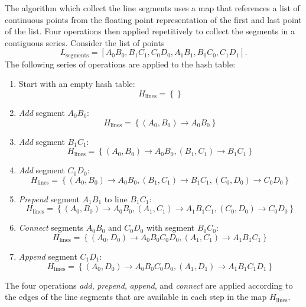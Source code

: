 \documentclass[english, a4paper]{article}
\begin{document}
The algorithm which collect the line segments uses a map that references a list of continuous points from the floating point representation of the first and last point of the list. Four operations then applied repetitively to collect the segments in a contiguous series. Consider the list of points
\begin{equation}
	L_{\mathrm{segments}} = \left[ A_{0}B_{0}, B_{1} C_{1}, C_{0}D_{0}, A_{1}B_{1}, B_{0}C_{0}, C_{1} D_{1} \right].
\end{equation}
The following series of operations are applied to the hash table:
\begin{enumerate}
\item Start with an empty hash table:
	\begin{equation}
		H_{\mathrm{lines}} = \left\{ \right\}
	\end{equation}
\item \emph{Add} segment $A_{0} B_{0}$:
	\begin{equation}
		H_{\mathrm{lines}} = \left\{ (A_{0}, B_{0}) \to A_{0} B_{0} \right\}
	\end{equation}
\item \emph{Add} segment $B_{1} C_{1}$:
	\begin{equation}
		H_{\mathrm{lines}} = \left\{ (A_{0}, B_{0}) \to A_{0} B_{0}, (B_{1}, C_{1}) \to B_{1} C_{1} \right\}
	\end{equation}
\item \emph{Add} segment $C_{0} D_{0}$:
	\begin{equation}
		H_{\mathrm{lines}} = \left\{ (A_{0}, B_{0}) \to A_{0} B_{0}, (B_{1}, C_{1}) \to B_{1} C_{1}, (C_{0}, D_{0}) \to C_{0} D_{0} \right\}
	\end{equation}
\item \emph{Prepend} segment $A_{1} B_{1}$ to line $B_{1} C_{1}$:
	\begin{equation}
		H_{\mathrm{lines}} = \left\{ (A_{0}, B_{0}) \to A_{0} B_{0}, (A_{1}, C_{1}) \to A_{1} B_{1} C_{1}, (C_{0}, D_{0}) \to C_{0} D_{0} \right\}
	\end{equation}
\item \emph{Connect} segments $A_{0} B_{0}$ and $C_{0} D_{0}$ with segment $B_{0} C_{0}$:
	\begin{equation}
		H_{\mathrm{lines}} = \left\{ (A_{0}, D_{0}) \to A_{0} B_{0} C_{0} D_{0}, (A_{1}, C_{1}) \to A_{1} B_{1} C_{1} \right\}
	\end{equation}
\item \emph{Append} segment $C_{1} D_{1}$:
	\begin{equation}
		H_{\mathrm{lines}} = \left\{ (A_{0}, D_{0}) \to A_{0} B_{0} C_{0} D_{0}, (A_{1}, D_{1}) \to A_{1} B_{1} C_{1} D_{1} \right\}
	\end{equation}
\end{enumerate}
The four operations \emph{add}, \emph{prepend}, \emph{append}, and \emph{connect} are applied according to the edges of the line segments that are available in each step in the map $H_{\mathrm{lines}}$.
\end{document}
